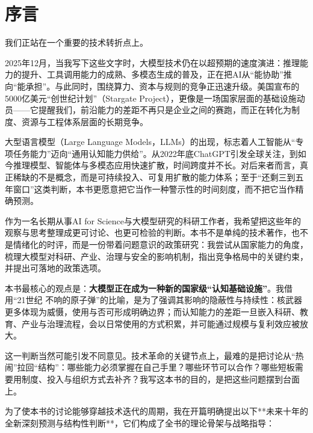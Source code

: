 \chapter*{序\quad 言}

我们正站在一个重要的技术转折点上。

2025年12月，当我写下这些文字时，大模型技术仍在以超预期的速度演进：推理能力的提升、工具调用能力的成熟、多模态生成的普及，正在把AI从“能协助”推向“能承担”。与此同时，围绕算力、资本与规则的竞争正迅速升级。美国宣布的5000亿美元“创世纪计划”（Stargate Project），更像是一场国家层面的基础设施动员——它提醒我们，前沿能力的差距不再只是企业之间的赛跑，而正在转化为制度、资源与工程体系层面的长期竞争。

大型语言模型（Large Language Models，LLMs）的出现，标志着人工智能从“专项任务能力”迈向“通用认知能力供给”。从2022年底ChatGPT引发全球关注，到如今推理模型、智能体与多模态应用快速扩散，时间跨度并不长。对后来者而言，真正稀缺的不是概念，而是可持续投入、可复用扩散的能力体系；至于“还剩三到五年窗口”这类判断，本书更愿意把它当作一种警示性的时间刻度，而不把它当作精确预测。

作为一名长期从事AI for Science与大模型研究的科研工作者，我希望把这些年的观察与思考整理成更可讨论、也更可检验的判断。本书不是单纯的技术著作，也不是情绪化的时评，而是一份带着问题意识的政策研究：我尝试从国家能力的角度，梳理大模型对科研、产业、治理与安全的影响机制，指出竞争格局中的关键约束，并提出可落地的政策选项。

本书最核心的观点是：\textbf{大模型正在成为一种新的国家级“认知基础设施”}。我借用“21世纪\,\,不响的原子弹”的比喻，是为了强调其影响的隐蔽性与持续性：核武器更多体现为威慑，使用与否可形成明确边界；而认知能力的差距一旦嵌入科研、教育、产业与治理流程，会以日常使用的方式积累，并可能通过规模与复利效应被放大。

这一判断当然可能引发不同意见。技术革命的关键节点上，最难的是把讨论从“热闹”拉回“结构”：哪些能力必须掌握在自己手里？哪些环节可以合作？哪些短板需要用制度、投入与组织方式去补齐？我写这本书的目的，是把这些问题摆到台面上。

为了使本书的讨论能够穿越技术迭代的周期，我在开篇明确提出以下**未来十年的全新深刻预测与结构性判断**，它们构成了全书的理论骨架与战略指导：

